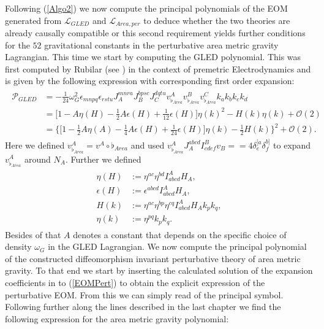 \documentclass[a4paper,12pt, DIV=14, BCOR=5mm, twoside, headsepline]{scrbook}
\begin{document}
Following (\ref{Algo2}) we now compute the principal polynomials of the EOM generated from $\mathcal{L}_{GLED}$ and $\mathcal{L}_{Area,per}$ to deduce whether the two theories are already causally compatible or this second requirement yields further conditions for the $52$ gravitational constants in the perturbative area metric gravity Lagrangian. This time we start by computing the GLED polynomial. This was first computed by Rubilar (see \cite{2009JPhA...42U5402I}) in the context of premetric Electrodynamics and is given by the following expression with corresponding first order expansion: 
\begin{align} \label{GLEDPoly}
\begin{aligned}
    \mathcal{P}_{GLED} &= -\frac{1}{24}\omega_G^2\epsilon_{mnpq}\epsilon_{rstu}J_A^{mnra}J_B^{bpsc}J_C^{dqtu} v_{\flat_{Area}}^A v_{\flat_{Area}}^B v_{\flat_{Area}}^C k_ak_bk_ck_d \\
                &= \bigl[ 1 -  A \eta(H)- \frac{1}{2} A \epsilon(H) + \frac{1}{12} \epsilon(H) \bigr] \eta(k)^2 - H(k)\eta(k) + \mathcal{O}(2)\\
                &= \bigl\{  \bigl[ 1 - \frac{1}{2} A \eta(A) - \frac{1}{4} A \epsilon(H) +  \frac{1}{24} \epsilon(H) \bigr] \eta(k) - \frac{1}{2} H(k)       \bigr\}^2 + \mathcal{O}(2).
\end{aligned}
\end{align}
Here we defined $v_{\flat_{Area}}^A = v^A \circ \flat_{Area}$ and used $v_{\flat_{Area}}^A J_A^{abcd} I^B_{cdef}v_B = = 4 \delta^{[a}_e \delta^{b]}_f$ to expand $v^A_{\flat_{Area}}$ around $N_A$. Further we defined
\begin{align}
\begin{aligned}
\eta(H) &:= \eta^{ac}\eta^{bd} I^A_{abcd} H_A, \\ 
\epsilon(H) &:=\epsilon^{abcd}I^A_{abcd}H_{A},\\ H(k) &:=\eta^{ac}\eta^{bp}\eta^{cq} I^A_{abcd}H_Ak_pk_q, \\ \eta(k)&:=\eta^{pq}k_pk_q.
\end{aligned}
\end{align}
Besides of that $A$ denotes a constant that depends on the specific choice of density $\omega_G$ in the GLED Lagrangian.  
We now compute the principal polynomial of the constructed diffeomorphism invariant perturbative theory of area metric gravity. To that end we start by inserting the calculated solution of the expansion coefficients in to (\ref{EOMPert}) to obtain the explicit expression of the perturbative EOM. From this we can simply read of the principal symbol. Following further along the lines described in the last chapter we find the following expression for the area metric gravity polynomial:
\end{document}
